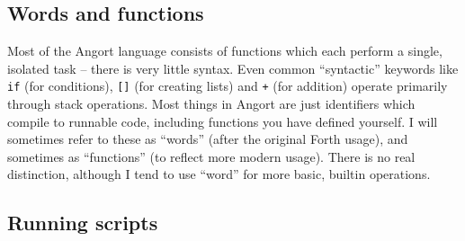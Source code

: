 \subsection{Words and functions}
Most of the Angort language consists of functions which each perform
a single, isolated task -- there is very little syntax. Even common
``syntactic'' keywords like \texttt{if} (for conditions), \texttt{[]} 
(for creating lists) and \texttt{+} (for addition) operate primarily through
stack operations.
Most things in Angort are just identifiers
which compile to runnable code, including functions you have defined
yourself. I will sometimes refer to these as 
``words'' (after the original Forth usage), and sometimes as ``functions''
(to reflect more modern usage). There is no real distinction, although
I tend to use ``word'' for more basic, builtin operations.

\subsection{Running scripts}

